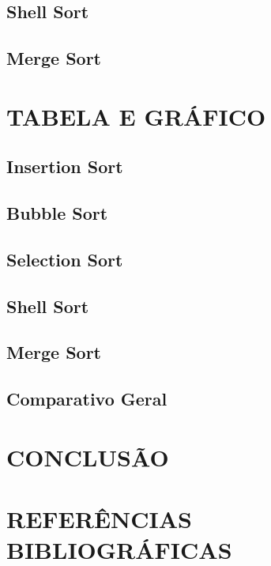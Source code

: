 \documentclass[12pt,arial]{article}
\begin{document}
		\subsection{Shell Sort}
		
	    \vspace*{1.5cm}
        \subsection{Merge Sort}
		
	    \vspace*{1.5cm}
        
		\section{TABELA E GRÁFICO}
            \subsection{Insertion Sort}
		
		\newpage
            \subsection{Bubble Sort}
		
		\newpage
            \subsection{Selection Sort}
		
		\newpage
            \subsection{Shell Sort}
		
		\newpage
            \subsection{Merge Sort}
		
		\newpage
            \subsection{Comparativo Geral}
		
		\newpage
  
		\section{CONCLUSÃO}
		
		\newpage
  
		\section{REFERÊNCIAS BIBLIOGRÁFICAS}
		
		\newpage
\end{document}
